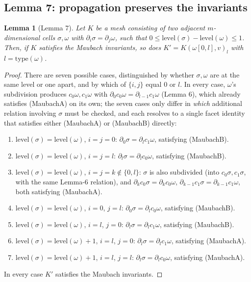 \documentclass[11pt]{article}
\newtheorem*{lemthm}{Lemma}
\newcommand{\type}{\mathrm{type}}
\newcommand{\level}{\mathrm{level}}
\begin{document}
\subsection{Lemma 7: propagation preserves the invariants}

\begin{lemthm}[Lemma 7]
Let $K$ be a mesh consisting of two adjacent $m$-dimensional cells
$\sigma,\omega$ with $\partial_i\sigma=\partial_j\omega$, such that
$0\le\level(\sigma)-\level(\omega)\le 1$. Then, if $K$ satisfies the
Maubach invariants, so does $K'=K(\omega[0,l],v)_l$ with $l=\type(\omega)$.
\end{lemthm}

\begin{proof}
There are seven possible cases, distinguished by whether $\sigma,\omega$
are at the same level or one apart, and by which of $\{i,j\}$ equal $0$ or
$l$. In every case, $\omega$'s subdivision produces $c_0\omega,c_1\omega$
with $\partial_0c_0\omega=\partial_{l-1}c_1\omega$ (Lemma 6), which already
satisfies (MaubachA) on its own; the seven cases only differ in \emph{which}
additional relation involving $\sigma$ must be checked, and each resolves
to a single facet identity that satisfies either (MaubachA) or (MaubachB)
directly:
\begin{enumerate}[itemsep=1pt,topsep=2pt]
  \item $\level(\sigma)=\level(\omega)$, $i=j=0$: $\partial_0\sigma=\partial_l c_1\omega$, satisfying (MaubachB).
  \item $\level(\sigma)=\level(\omega)$, $i=j=l$: $\partial_l\sigma=\partial_l c_0\omega$, satisfying (MaubachB).
  \item $\level(\sigma)=\level(\omega)$, $i=j=k\notin\{0,l\}$: $\sigma$ is
    also subdivided (into $c_0\sigma,c_1\sigma$, with the same Lemma-6
    relation), and $\partial_k c_0\sigma=\partial_k c_0\omega$,
    $\partial_{k-1}c_1\sigma=\partial_{k-1}c_1\omega$, both satisfying (MaubachA).
  \item $\level(\sigma)=\level(\omega)$, $i=0$, $j=l$: $\partial_0\sigma=\partial_l c_0\omega$, satisfying (MaubachB).
  \item $\level(\sigma)=\level(\omega)$, $i=l$, $j=0$: $\partial_l\sigma=\partial_l c_1\omega$, satisfying (MaubachB).
  \item $\level(\sigma)=\level(\omega)+1$, $i=l$, $j=0$: $\partial_l\sigma=\partial_l c_1\omega$, satisfying (MaubachA).
  \item $\level(\sigma)=\level(\omega)+1$, $i=l$, $j=l$: $\partial_l\sigma=\partial_l c_0\omega$, satisfying (MaubachA).
\end{enumerate}
In every case $K'$ satisfies the Maubach invariants.
\end{proof}
\end{document}
